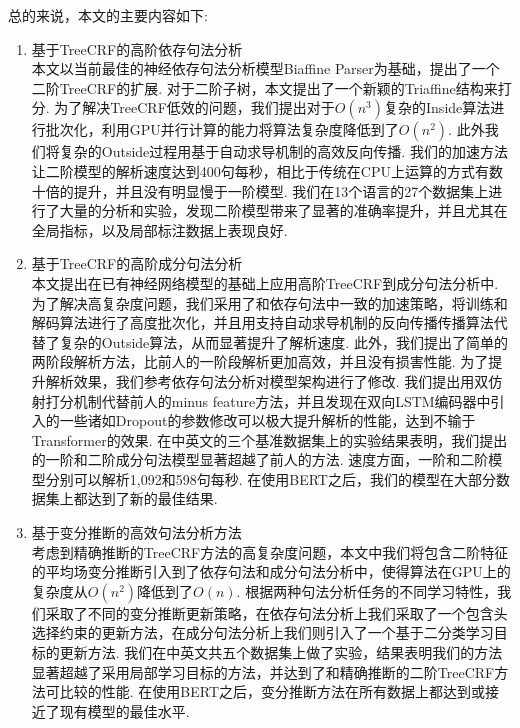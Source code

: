 总的来说，本文的主要内容如下:
\begin{enumerate}
	\item 基于TreeCRF的高阶依存句法分析\\
	      \indent 本文以当前最佳的神经依存句法分析模型Biaffine Parser为基础，提出了一个二阶TreeCRF的扩展.
	      对于二阶子树，本文提出了一个新颖的Triaffine结构来打分.
	      为了解决TreeCRF低效的问题，我们提出对于$O(n^3)$复杂的Inside算法进行批次化，利用GPU并行计算的能力将算法复杂度降低到了$O(n^2)$.
	      此外我们将复杂的Outside过程用基于自动求导机制的高效反向传播.
	      我们的加速方法让二阶模型的解析速度达到400句每秒，相比于传统在CPU上运算的方式有数十倍的提升，并且没有明显慢于一阶模型.
	      我们在13个语言的27个数据集上进行了大量的分析和实验，发现二阶模型带来了显著的准确率提升，并且尤其在全局指标，以及局部标注数据上表现良好.
	\item 基于TreeCRF的高阶成分句法分析\\
	      \indent 本文提出在已有神经网络模型的基础上应用高阶TreeCRF到成分句法分析中.
	      为了解决高复杂度问题，我们采用了和依存句法中一致的加速策略，将训练和解码算法进行了高度批次化，并且用支持自动求导机制的反向传播传播算法代替了复杂的Outside算法，从而显著提升了解析速度.
	      此外，我们提出了简单的两阶段解析方法，比前人的一阶段解析更加高效，并且没有损害性能.
	      为了提升解析效果，我们参考依存句法分析对模型架构进行了修改.
	      我们提出用双仿射打分机制代替前人的minus feature方法，并且发现在双向LSTM编码器中引入的一些诸如Dropout的参数修改可以极大提升解析的性能，达到不输于Transformer的效果.
	      在中英文的三个基准数据集上的实验结果表明，我们提出的一阶和二阶成分句法模型显著超越了前人的方法.
	      速度方面，一阶和二阶模型分别可以解析1,092和598句每秒.
	      在使用BERT之后，我们的模型在大部分数据集上都达到了新的最佳结果.
	\item 基于变分推断的高效句法分析方法\\
	      \indent 考虑到精确推断的TreeCRF方法的高复杂度问题，本文中我们将包含二阶特征的平均场变分推断引入到了依存句法和成分句法分析中，使得算法在GPU上的复杂度从$O(n^2)$降低到了$O(n)$.
	      根据两种句法分析任务的不同学习特性，我们采取了不同的变分推断更新策略，在依存句法分析上我们采取了一个包含头选择约束的更新方法，在成分句法分析上我们则引入了一个基于二分类学习目标的更新方法.
	      我们在中英文共五个数据集上做了实验，结果表明我们的方法显著超越了采用局部学习目标的方法，并达到了和精确推断的二阶TreeCRF方法可比较的性能.
	      在使用BERT之后，变分推断方法在所有数据上都达到或接近了现有模型的最佳水平.
\end{enumerate}

